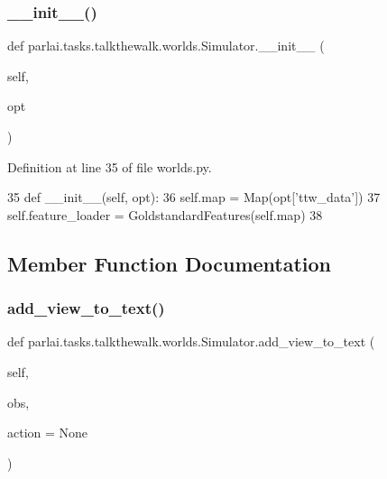 \subsubsection{\texorpdfstring{\+\_\+\+\_\+init\+\_\+\+\_\+()}{\_\_init\_\_()}}
{\footnotesize\ttfamily def parlai.\+tasks.\+talkthewalk.\+worlds.\+Simulator.\+\_\+\+\_\+init\+\_\+\+\_\+ (\begin{DoxyParamCaption}\item[{}]{self,  }\item[{}]{opt }\end{DoxyParamCaption})}



Definition at line 35 of file worlds.\+py.


\begin{DoxyCode}
35     \textcolor{keyword}{def }\_\_init\_\_(self, opt):
36         self.map = Map(opt[\textcolor{stringliteral}{'ttw\_data'}])
37         self.feature\_loader = GoldstandardFeatures(self.map)
38 
\end{DoxyCode}


\subsection{Member Function Documentation}
\mbox{\label{classparlai_1_1tasks_1_1talkthewalk_1_1worlds_1_1Simulator_a7f1a6089e2650f3787e5493931a45570}} 
\subsubsection{\texorpdfstring{add\+\_\+view\+\_\+to\+\_\+text()}{add\_view\_to\_text()}}
{\footnotesize\ttfamily def parlai.\+tasks.\+talkthewalk.\+worlds.\+Simulator.\+add\+\_\+view\+\_\+to\+\_\+text (\begin{DoxyParamCaption}\item[{}]{self,  }\item[{}]{obs,  }\item[{}]{action = {\ttfamily None} }\end{DoxyParamCaption})}



